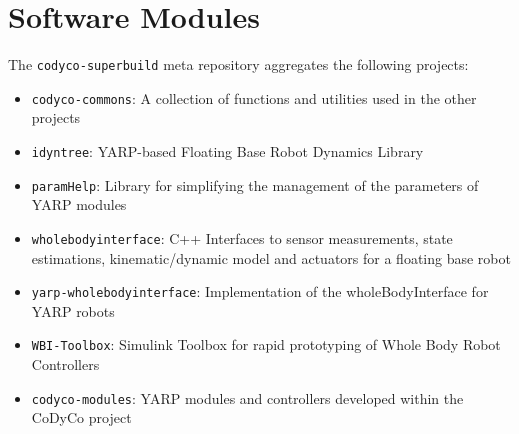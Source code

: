 \documentclass[12pt,a4paper,twoside]{article}
\begin{document}
\section{Software Modules}
The \texttt{codyco-superbuild} meta repository aggregates the following projects: \\
\begin{itemize}
\item \texttt{codyco-commons}: A collection of functions and utilities used in the other projects
\item \texttt{idyntree}: YARP-based Floating Base Robot Dynamics Library
\item \texttt{paramHelp}: Library for simplifying the management of the parameters of YARP modules
\item \texttt{wholebodyinterface}: C++ Interfaces to sensor measurements, state estimations, kinematic/dynamic model and actuators for a floating base robot
\item \texttt{yarp-wholebodyinterface}: Implementation of the wholeBodyInterface for YARP robots
\item \texttt{WBI-Toolbox}: Simulink Toolbox for rapid prototyping of Whole Body Robot Controllers
\item \texttt{codyco-modules}: YARP modules and controllers developed within the CoDyCo project
\end{itemize}


\end{document}
